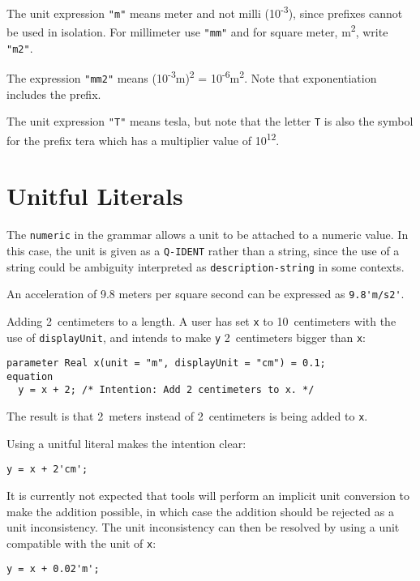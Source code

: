 \begin{example}
The unit expression \lstinline!"m"! means meter and not milli (10\textsuperscript{-3}), since prefixes cannot be used in isolation.
For millimeter use \lstinline!"mm"! and for square meter, m\textsuperscript{2}, write \lstinline!"m2"!.

The expression \lstinline!"mm2"! means (10\textsuperscript{-3}m)\textsuperscript{2} = 10\textsuperscript{-6}m\textsuperscript{2}.
Note that exponentiation includes the prefix.

The unit expression \lstinline!"T"! means tesla, but note that the letter \lstinline!T! is also the symbol for the prefix tera which has a multiplier value of 10\textsuperscript{12}.
\end{example}


\section{Unitful Literals}

The \lstinline[language=grammar]!numeric! in the grammar allows a unit to be attached to a numeric value.
In this case, the unit is given as a \lstinline[language=grammar]!Q-IDENT! rather than a string, since the use of a string could be ambiguity interpreted as \lstinline[language=grammar]!description-string! in some contexts.

\begin{example}
An acceleration of 9.8 meters per square second can be expressed as \lstinline!9.8'm/s2'!.
\end{example}

\begin{example}
Adding 2~centimeters to a length.
A user has set \lstinline!x! to 10~centimeters with the use of \lstinline!displayUnit!, and intends to make \lstinline!y! 2~centimeters bigger than \lstinline!x!:
\begin{lstlisting}[language=modelica]
  parameter Real x(unit = "m", displayUnit = "cm") = 0.1;
equation
  y = x + 2; /* Intention: Add 2 centimeters to x. */
\end{lstlisting}
The result is that 2~meters instead of 2~centimeters is being added to \lstinline!x!.

Using a unitful literal makes the intention clear:
\begin{lstlisting}[language=modelica]
  y = x + 2'cm';
\end{lstlisting}
It is currently not expected that tools will perform an implicit unit conversion to make the addition possible, in which case the addition should be rejected as a unit inconsistency.
The unit inconsistency can then be resolved by using a unit compatible with the unit of \lstinline!x!:
\begin{lstlisting}[language=modelica]
  y = x + 0.02'm';
\end{lstlisting}
\end{example}
